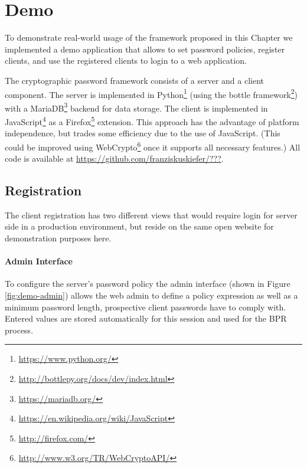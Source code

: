 \section{Demo} \label{sec:vpake-demo}

To demonstrate real-world usage of the framework proposed in this Chapter we implemented a demo application that allows to set password policies, register clients, and use the registered clients to login to a web application.

The cryptographic password framework consists of a server and a client component.
The server is implemented in Python\footnote{\url{https://www.python.org/}} (using the bottle framework\footnote{\url{http://bottlepy.org/docs/dev/index.html}}) with a MariaDB\footnote{\url{https://mariadb.org/}} backend for data storage.
The client is implemented in JavaScript\footnote{\url{https://en.wikipedia.org/wiki/JavaScript}} as a Firefox\footnote{\url{http://firefox.com/}} extension.
This approach has the advantage of platform independence, but trades some efficiency due to the use of JavaScript.
(This could be improved using WebCrypto\footnote{\url{http://www.w3.org/TR/WebCryptoAPI/}} once it supports all necessary features.)
All code is available at \url{https://github.com/franziskuskiefer/???}.

\subsection{Registration}
The client registration has two different views that would require login for server side in a production environment, but reside on the same open website for demonstration purposes here.

\paragraph{Admin Interface}
To configure the server's password policy the admin interface (shown in Figure \ref{fig:demo-admin}) allows the web admin to define a policy expression as well as a minimum password length, prospective client passwords have to comply with.
Entered values are stored automatically for this session and used for the \ac{BPR} process.

